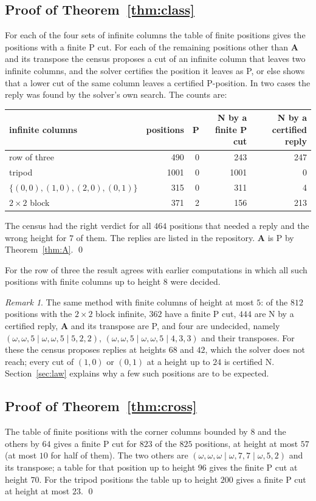 \documentclass[11pt]{amsart}
\theoremstyle{definition}
\theoremstyle{remark}
\newtheorem{remark}[theorem]{Remark}
\newcommand{\w}{\omega}
\newcommand{\PA}{\mathbf{A}}
\begin{document}
\subsection{Proof of Theorem~\ref{thm:class}}
For each of the four sets of infinite columns the table of finite positions gives the
positions with a finite P cut. For each of the remaining positions other than $\PA$ and its
transpose the census proposes a cut of an infinite column that leaves two infinite columns,
and the solver certifies the position it leaves as P, or else shows that a lower cut of the
same column leaves a certified P-position. In two cases the reply was found by the solver's
own search. The counts are:
\begin{center}
\begin{tabular}{lrrrr}
\toprule
infinite columns & positions & P & N by a finite P cut & N by a certified reply\\
\midrule
row of three & 490 & 0 & 243 & 247\\
tripod & 1001 & 0 & 1001 & 0\\
$\{(0,0),(1,0),(2,0),(0,1)\}$ & 315 & 0 & 311 & 4\\
$2\times2$ block & 371 & 2 & 156 & 213\\
\bottomrule
\end{tabular}
\end{center}
The census had the right verdict for all $464$ positions that needed a reply and the wrong
height for $7$ of them. The replies are listed in the repository. $\PA$ is P by
Theorem~\ref{thm:A}. \qed

\medskip
For the row of three the result agrees with earlier computations in which all such positions
with finite columns up to height $8$ were decided.

\begin{remark}\label{rem:five}
The same method with finite columns of height at most $5$: of the $812$ positions with the
$2\times2$ block infinite, $362$ have a finite P cut, $444$ are N by a certified reply, $\PA$
and its transpose are P, and four are undecided, namely
$(\w,\w,5\mid\w,\w,5\mid5,2,2)$, $(\w,\w,5\mid\w,\w,5\mid4,3,3)$ and their transposes. For
these the census proposes replies at heights $68$ and $42$, which the solver does not reach;
every cut of $(1,0)$ or $(0,1)$ at a height up to $24$ is certified N. Section~\ref{sec:law}
explains why a few such positions are to be expected.
\end{remark}

\subsection{Proof of Theorem~\ref{thm:cross}}
The table of finite positions with the corner columns bounded by $8$ and the others by $64$
gives a finite P cut for $823$ of the $825$ positions, at height at most $57$ (at most $10$ for
half of them). The two others are $(\w,\w,\w\mid\w,7,7\mid\w,5,2)$ and its transpose; a table
for that position up to height $96$ gives the finite P cut at height $70$. For the tripod
positions the table up to height $200$ gives a finite P cut at height at most $23$. \qed
\end{document}
